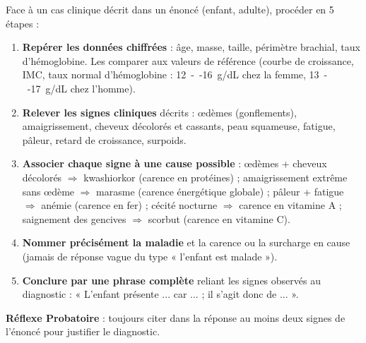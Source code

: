 \documentclass[11pt]{article}
\begin{document}
\begin{methode}
Face à un cas clinique décrit dans un énoncé (enfant, adulte), procéder en 5 étapes :
\begin{enumerate}
\item \textbf{Repérer les données chiffrées} : âge, masse, taille, périmètre brachial, taux d'hémoglobine. Les comparer aux valeurs de référence (courbe de croissance, IMC, taux normal d'hémoglobine : \SI{12}{--}\SI{16}{g/dL} chez la femme, \SI{13}{--}\SI{17}{g/dL} chez l'homme).
\item \textbf{Relever les signes cliniques} décrits : œdèmes (gonflements), amaigrissement, cheveux décolorés et cassants, peau squameuse, fatigue, pâleur, retard de croissance, surpoids.
\item \textbf{Associer chaque signe à une cause possible} : œdèmes + cheveux décolorés $\Rightarrow$ kwashiorkor (carence en protéines) ; amaigrissement extrême sans œdème $\Rightarrow$ marasme (carence énergétique globale) ; pâleur + fatigue $\Rightarrow$ anémie (carence en fer) ; cécité nocturne $\Rightarrow$ carence en vitamine A ; saignement des gencives $\Rightarrow$ scorbut (carence en vitamine C).
\item \textbf{Nommer précisément la maladie} et la carence ou la surcharge en cause (jamais de réponse vague du type « l'enfant est malade »).
\item \textbf{Conclure par une phrase complète} reliant les signes observés au diagnostic : « L'enfant présente ... car ... ; il s'agit donc de ... ».
\end{enumerate}
\textbf{Réflexe Probatoire} : toujours citer dans la réponse au moins deux signes de l'énoncé pour justifier le diagnostic.
\end{methode}
\end{document}
